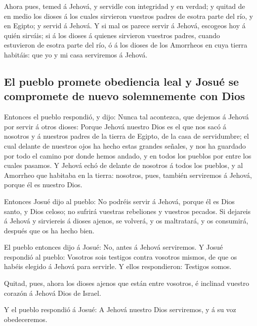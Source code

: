  Ahora pues, temed á Jehová, y servidle con integridad y en
verdad; y quitad de en medio los dioses á los cuales sirvieron vuestros
padres de esotra parte del río, y en Egipto; y servid á Jehová.
 Y si mal os parece servir á Jehová, escogeos hoy á quién
sirváis; si á los dioses á quienes sirvieron vuestros padres, cuando
estuvieron de esotra parte del río, ó á los dioses de los Amorrheos en
cuya tierra habitáis: que yo y mi casa serviremos á Jehová.

\hypertarget{el-pueblo-promete-obediencia-leal-y-josuuxe9-se-compromete-de-nuevo-solemnemente-con-dios}{%
\subsection{El pueblo promete obediencia leal y Josué se compromete de
nuevo solemnemente con
Dios}\label{el-pueblo-promete-obediencia-leal-y-josuuxe9-se-compromete-de-nuevo-solemnemente-con-dios}}

 Entonces el pueblo respondió, y dijo: Nunca tal acontezca,
que dejemos á Jehová por servir á otros dioses:  Porque
Jehová nuestro Dios es el que nos sacó á nosotros y á nuestros padres de
la tierra de Egipto, de la casa de servidumbre; el cual delante de
nuestros ojos ha hecho estas grandes señales, y nos ha guardado por todo
el camino por donde hemos andado, y en todos los pueblos por entre los
cuales pasamos.  Y Jehová echó de delante de nosotros á
todos los pueblos, y al Amorrheo que habitaba en la tierra: nosotros,
pues, también serviremos á Jehová, porque él es nuestro Dios.

 Entonces Josué dijo al pueblo: No podréis servir á Jehová,
porque él es Dios santo, y Dios celoso; no sufrirá vuestras rebeliones y
vuestros pecados.  Si dejareis á Jehová y sirviereis á
dioses ajenos, se volverá, y os maltratará, y os consumirá, después que
os ha hecho bien.

 El pueblo entonces dijo á Josué: No, antes á Jehová
serviremos.  Y Josué respondió al pueblo: Vosotros sois
testigos contra vosotros mismos, de que os habéis elegido á Jehová para
servirle. Y ellos respondieron: Testigos somos.

 Quitad, pues, ahora los dioses ajenos que están entre
vosotros, é inclinad vuestro corazón á Jehová Dios de Israel.

 Y el pueblo respondió á Josué: A Jehová nuestro Dios
serviremos, y á su voz obedeceremos.

